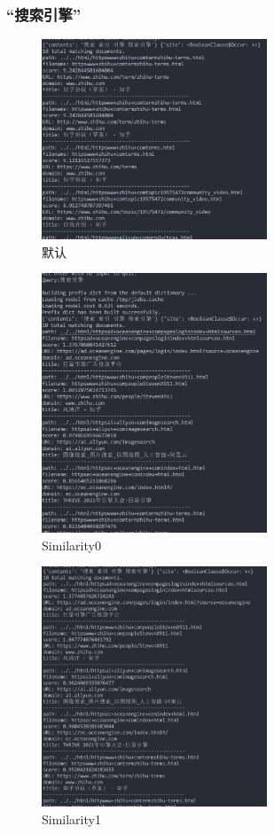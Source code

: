 \documentclass[12pt,a4paper]{article}
\begin{document}
\subsubsection{“搜索引擎”}

\begin{figure}[H]
	\includegraphics[width=0.6\textwidth]{4_-1.png}
	\centering
	 \caption{默认}
\end{figure}
\begin{figure}[H]
	\includegraphics[width=0.6\textwidth]{4_0.png}
	\centering
	 \caption{Similarity0}
\end{figure}
\begin{figure}[H]
	\includegraphics[width=0.6\textwidth]{4_1.png}
	\centering
	 \caption{Similarity1}
\end{figure}
\end{document}
